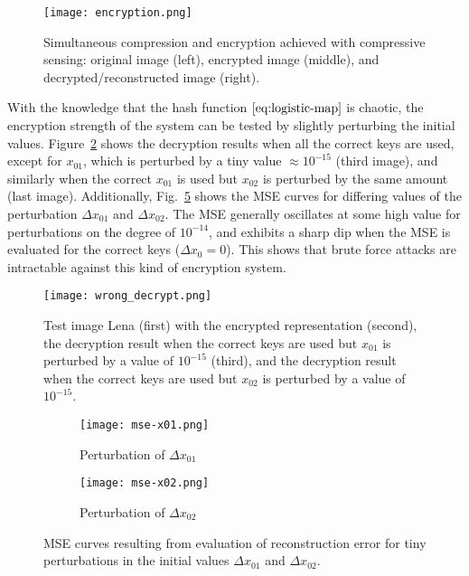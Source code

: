 \begin{figure}[htb]
	\texttt{[image: encryption.png]}
	\caption{Simultaneous compression and encryption achieved with compressive sensing: original image (left), encrypted image (middle), and decrypted/reconstructed image (right).}
	\label{fig:encryption}
\end{figure}

With the knowledge that the hash function $\eqref{eq:logistic-map}$ is chaotic, the encryption strength of the system can be tested by slightly perturbing the initial values. Figure~\ref{fig:wrong-decryption} shows the decryption results when all the correct keys are used, except for $x_{01}$, which is perturbed by a tiny value $\approx 10^{-15}$ (third image), and similarly when the correct $x_{01}$ is used but $x_{02}$ is perturbed by the same amount (last image). Additionally, Fig.~\ref{fig:perturb-mse} shows the MSE curves for differing values of the perturbation $\Delta x_{01}$ and $\Delta x_{02}$. The MSE generally oscillates at some high value for perturbations on the degree of $10^{-14}$, and exhibits a sharp dip when the MSE is evaluated for the correct keys ($\Delta x_0 = 0$). This shows that brute force attacks are intractable against this kind of encryption system.

\begin{figure}[htb]
	\texttt{[image: wrong\_decrypt.png]}
	\caption{Test image Lena (first) with the encrypted representation (second), the decryption result when the correct keys are used but $x_{01}$ is perturbed by a value of $10^{-15}$ (third), and the decryption result when the correct keys are used but $x_{02}$ is perturbed by a value of $10^{-15}$.}
	\label{fig:wrong-decryption}
\end{figure}

\begin{figure}[htb]
	\centering
	\begin{subfigure}{0.49\textwidth}
		\centering
		\texttt{[image: mse-x01.png]}
		\caption{Perturbation of $\Delta x_{01}$}
		\label{fig:perturb-mse-x01}
	\end{subfigure} 
	\begin{subfigure}{0.49\textwidth}
		\centering
		\texttt{[image: mse-x02.png]}
		\caption{Perturbation of $\Delta x_{02}$}
		\label{fig:perturb-mse-x02}
	\end{subfigure}
	\caption{MSE curves resulting from evaluation of reconstruction error for tiny perturbations in the initial values $\Delta x_{01}$ and $\Delta x_{02}$.}
	\label{fig:perturb-mse}
\end{figure}